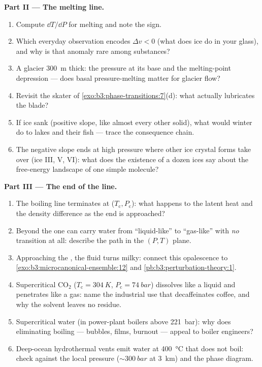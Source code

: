 \begin{problem}
\medskip\noindent\textbf{Part II --- The melting line.}
\begin{enumerate}[resume]
  \item Compute $\dd T/\dd P$ for melting and note the sign.
  \item Which everyday observation encodes $\Delta v < 0$ (what
        does ice do in your glass), and why is that anomaly rare
        among substances?
  \item A glacier \qty{300}{m} thick: the pressure at its base
        and the melting-point depression --- does basal
        pressure-melting matter for glacier flow?
  \item Revisit the skater of
        \cref{exo:b3:phase-transitions:7}(d): what actually
        lubricates the blade?
  \item If ice sank (positive slope, like almost every other
        solid), what would winter do to lakes and their fish ---
        trace the consequence chain.
  \item The negative slope ends at high pressure where other ice
        crystal forms take over (ice III, V, VI): what does the
        existence of a dozen ices say about the free-energy
        landscape of one simple molecule?
\end{enumerate}

\medskip\noindent\textbf{Part III --- The end of the line.}
\begin{enumerate}[resume]
  \item The boiling line terminates at ($T_{\text{c}},
        P_{\text{c}}$): what happens to the latent heat and the
        density difference as the end is approached?
  \item Beyond the  one can carry water from
        ``liquid-like'' to ``gas-like'' with \emph{no} transition
        at all: describe the path in the $(P, T)$ plane.
  \item Approaching the , the fluid turns milky:
        connect this opalescence to
        \cref{exo:b3:microcanonical-ensemble:12} and
        \cref{pb:b3:perturbation-theory:1}.
  \item Supercritical CO$_2$ ($T_{\text{c}} = \qty{304}{K}$,
        $P_{\text{c}} = \qty{74}{bar}$) dissolves like a liquid
        and penetrates like a gas: name the industrial use that
        decaffeinates coffee, and why the solvent leaves no
        residue.
  \item Supercritical water (in power-plant boilers above
        \qty{221}{bar}): why does eliminating boiling ---
        bubbles, films, burnout --- appeal to boiler engineers?
  \item Deep-ocean hydrothermal vents emit water at
        \qty{400}{\celsius} that does not boil: check against the
        local pressure ($\sim\qty{300}{bar}$ at \qty{3}{km}) and
        the phase diagram.
\end{enumerate}


\end{problem}
